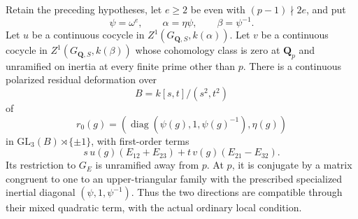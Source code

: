 \begin{theorem}
Retain the preceding hypotheses, let $e\ge2$ be even with
$(p-1)\nmid2e$, and put
\[
        \psi=\omega^e,\qquad
        \alpha=\eta\psi,\qquad \beta=\psi^{-1}.
                                                               \tag{MC.7}
\]
Let $u$ be a continuous cocycle in
$Z^1(G_{\mathbf Q,S},k(\alpha))$.
Let $v$ be a continuous cocycle in $Z^1(G_{\mathbf Q,S},k(\beta))$
whose cohomology class is zero at $\mathbf Q_p$ and unramified
on inertia at every finite prime other than $p$.
There is a continuous polarized residual deformation over
\[
                           B=k[s,t]/(s^2,t^2)             \tag{MC.8}
\]
of
\[
 r_0(g)=(\operatorname{diag}(\psi(g),1,\psi(g)^{-1}),\eta(g))
\]
in $\mathrm{GL}_3(B)\rtimes\{\pm1\}$, with first-order
terms
\[
       s\,u(g)(E_{12}+E_{23})+
                         t\,v(g)(E_{21}-E_{32}).          \tag{MC.9}
\]
Its restriction to $G_E$ is unramified away from $p$.
At $p$, it is conjugate by a matrix congruent to one to an
upper-triangular family with the prescribed specialized
inertial diagonal $(\psi,1,\psi^{-1})$.
Thus the two directions are compatible through their mixed
quadratic term, with the actual ordinary local condition.
\end{theorem}


